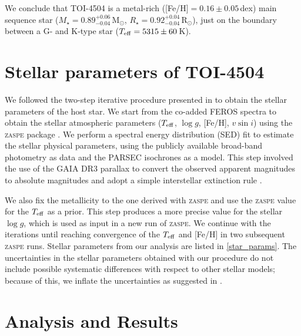 \documentclass[twocolumn,twocolappendix]{aastex631}
\let\orgautoref\autoref
\renewcommand{\autoref}
        {\def\equationautorefname{Eq.}%
         \def\figureautorefname{Fig.}%
         \def\sectionautorefname{Sect.}%
         \def\subsectionautorefname{Sect.}%
         \def\subsubsectionautorefname{Sect.}%
         \orgautoref}
\begin{document}
We conclude that TOI-4504 is a metal-rich ([Fe/H]$ = 0.16\pm0.05$\,dex) main sequence star ($M_{\star} = 0.89^{+0.06}_{-0.04}$\,M$_{\odot}$, $R_{\star} = 0.92^{+0.04}_{-0.04}$\,R$_{\odot}$), just on the boundary between a G- and K-type star ($T_{\rm{eff}} = 5315 \pm 60$\,K). 




\section{Stellar parameters of TOI-4504}
\label{sec3}

We followed the two-step iterative procedure presented in \citet{wine1} to obtain the stellar parameters of the host star. We start from the co-added FEROS spectra to obtain the stellar atmospheric parameters ($T_{\rm{eff}}$, $\log g$, [Fe/H], $v \sin i$) using the \textsc{zaspe} package \citep{zaspe}.%
We perform a spectral energy distribution (SED) fit to estimate the stellar physical parameters, using the publicly available broad-band photometry as data and the PARSEC isochrones as a model. This step involved the use of the GAIA DR3 \citep{gaia_b} parallax to convert the observed apparent magnitudes to absolute magnitudes and adopt a simple interstellar extinction rule \citep{cardelli:1989}. 

We also fix the metallicity to the one derived with \textsc{zaspe} and use the \textsc{zaspe} value for the $T_{\rm{eff}}$ as a prior. This step produces a more precise value for the stellar $\log g$, which is used as input in a new run of \textsc{zaspe}. We continue with the iterations until reaching convergence of the $T_{\rm{eff}}$ and [Fe/H] in two subsequent \textsc{zaspe} runs.
Stellar parameters from our analysis are listed in \autoref{star_params}.
The uncertainties in the stellar parameters obtained with our procedure do not include possible systematic differences with respect to other stellar models; because of this, we inflate the uncertainties as suggested in \cite{Tayar_2022}.


\section{Analysis and Results}
\label{sec4}

\end{document}

